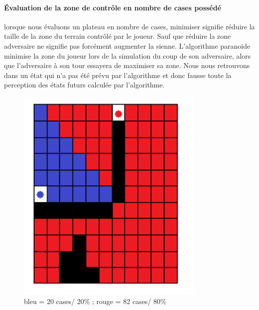 \paragraph{Évaluation de la zone de contrôle en nombre de cases possédé}
lorsque nous évaluons un plateau en nombre de cases, minimiser
signifie réduire la taille de la zone du terrain contrôlé par le joueur.
Sauf que réduire la zone adversaire ne signifie pas forcément augmenter la
sienne. L'algorithme paranoïde minimise la zone du joueur lors de la 
simulation du coup de son adversaire, alors que l'adversaire à son tour
essayera de maximiser sa zone. Nous nous retrouvons dans un état qui n'a
pas été prévu par l'algorithme et donc fausse toute la perception des états
futurs calculée par l'algorithme.

\begin{figure}[H]
	\centering
	\includegraphics[width=0.8\textwidth, keepaspectratio, height=0.2\textheight]{./pics/nbr_case.png}	
	\caption{bleu = 20 cases/ 20\% ; rouge = 82 cases/ 80\%}
\end{figure}

